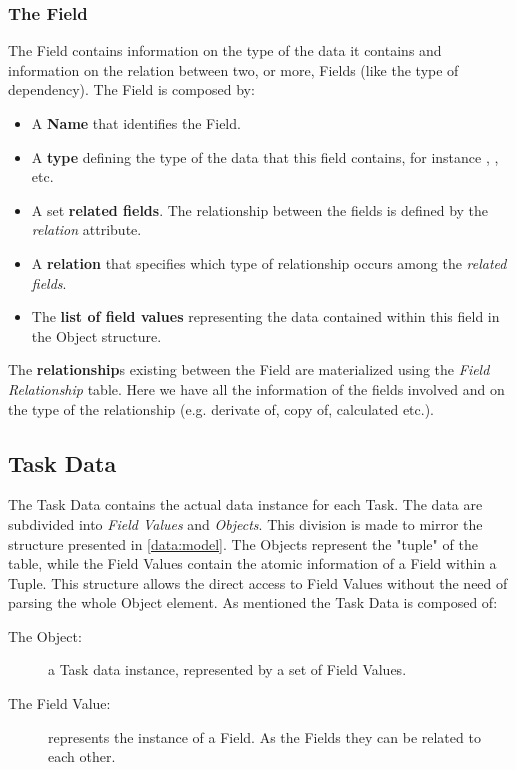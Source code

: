 \subsubsection{The Field}
The Field contains information on the type of the data it contains and information
on the relation between two, or more, Fields (like the type of dependency).
The Field is composed by:
\begin{itemize}
    \item A \textbf{Name} that identifies the Field.
    
    \item A \textbf{type} defining the type of the data that this field contains,
    for instance , , etc.

    \item A set \textbf{related fields}. The relationship between the fields
    is defined by the \emph{relation} attribute.
    
    \item A \textbf{relation} that specifies which type of relationship occurs
    among the \emph{related fields}.

    \item The \textbf{list of field values} representing the data contained within
    this field in the Object structure.
\end{itemize}

The \textbf{relationship}s existing between the Field are materialized using the
\emph{Field Relationship} table. Here we have all the information of the fields
involved and on the type of the relationship (e.g. derivate of, copy of, calculated
etc.).








\subsection{Task Data}
The Task Data contains the actual data instance for each Task. The data
are subdivided into \emph{Field Values} and \emph{Objects}. This division is made
to mirror the structure presented in \ref{data:model}. The Objects represent
the "tuple" of the table, while the Field Values contain the atomic information
of a Field within a Tuple. This structure allows the direct access to Field
Values without the need of parsing the whole Object element. As mentioned the
Task Data is composed of:
\begin{description}
    \item[The Object:] a Task data instance, represented by a set of Field Values.
    \item[The Field Value:] represents the instance of a Field. As the Fields
    they can be related to each other.
\end{description}


